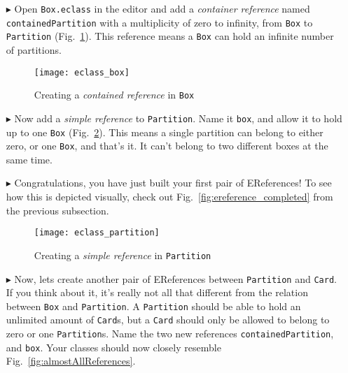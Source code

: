 \begin{itemize}

\item[$\blacktriangleright$] Open \texttt{Box.eclass} in the editor and add a \emph{container reference} named \texttt{containedPartition} with a
multiplicity of zero to infinity, from \texttt{Box} to \texttt{Partition} (Fig.~\ref{fig:cpartitionReference}). This reference means a \texttt{Box}
can hold an infinite number of partitions.

\vspace{0.5cm}

\begin{figure}[htbp]
	\centering
  \texttt{[image: eclass\_box]}
	\caption{Creating a \emph{contained reference} in \texttt{Box}}
	\label{fig:cpartitionReference}
\end{figure} 

\vspace{0.5cm}

\item[$\blacktriangleright$] Now add a \emph{simple reference} to \texttt{Partition}. Name it \texttt{box}, and allow it to hold up to one \texttt{Box}
(Fig.~\ref{fig:boxReference}). This means a single partition can belong to either zero, or one \texttt{Box}, and that's it. It can't belong to two different
boxes at the same time.

\item[$\blacktriangleright$] Congratulations, you have just built your first pair of EReferences! To see how this is depicted visually, check out
Fig.~\ref{fig:ereference_completed} from the previous subsection.

\newpage

\vspace{0.5cm}

\begin{figure}[htbp]
	\centering
  \texttt{[image: eclass\_partition]}
	\caption{Creating a \emph{simple reference} in \texttt{Partition}}
	\label{fig:boxReference}
\end{figure} 

\vspace{0.5cm}

\item[$\blacktriangleright$] Now, lets create another pair of EReferences between \texttt{Partition} and \texttt{Card}. If you think about it, it's really not
all that different from the relation between \texttt{Box} and \texttt{Partition}. A \texttt{Partition} should be able to hold an unlimited amount of
\texttt{Card}s, but a \texttt{Card} should only be allowed to belong to zero or one \texttt{Partition}s. Name the two new references
\texttt{containedPartition}, and \texttt{box}. Your classes should now closely resemble Fig.~\ref{fig:almostAllReferences}.


\end{itemize}

